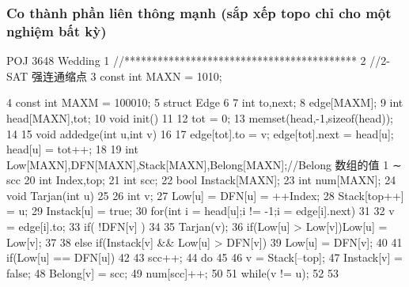 \documentclass[11pt]{article}
\begin{document}
\subsubsection{Co thành phần liên thông mạnh (sắp xếp topo chỉ cho một nghiệm bất kỳ)}

\begin{Code}
     POJ 3648 Wedding
1 //******************************************
2 //2-SAT 强连通缩点
3 const int MAXN = 1010;


 4   const int MAXM = 100010;
 5   struct Edge
 6   {
 7       int to,next;
 8   }edge[MAXM];
 9   int head[MAXN],tot;
10   void init()
11   {
12       tot = 0;
13       memset(head,-1,sizeof(head));
14   }
15   void addedge(int u,int v)
16   {
17       edge[tot].to = v; edge[tot].next = head[u]; head[u] = tot++;
18   }
19   int Low[MAXN],DFN[MAXN],Stack[MAXN],Belong[MAXN];//Belong 数组的值 1
        ∼ scc
20   int Index,top;
21   int scc;
22   bool Instack[MAXN];
23   int num[MAXN];
24   void Tarjan(int u)
25   {
26       int v;
27       Low[u] = DFN[u] = ++Index;
28       Stack[top++] = u;
29       Instack[u] = true;
30       for(int i = head[u];i != -1;i = edge[i].next)
31       {
32           v = edge[i].to;
33           if( !DFN[v] )
34           {
35                Tarjan(v);
36                if(Low[u] > Low[v])Low[u] = Low[v];
37           }
38           else if(Instack[v] && Low[u] > DFN[v])
39                Low[u] = DFN[v];
40       }
41       if(Low[u] == DFN[u])
42       {
43           scc++;
44           do
45           {
46                v = Stack[--top];
47                Instack[v] = false;
48                Belong[v] = scc;
49                num[scc]++;
50           }
51           while(v != u);
52       }
53   }



\end{Code}
\end{document}
